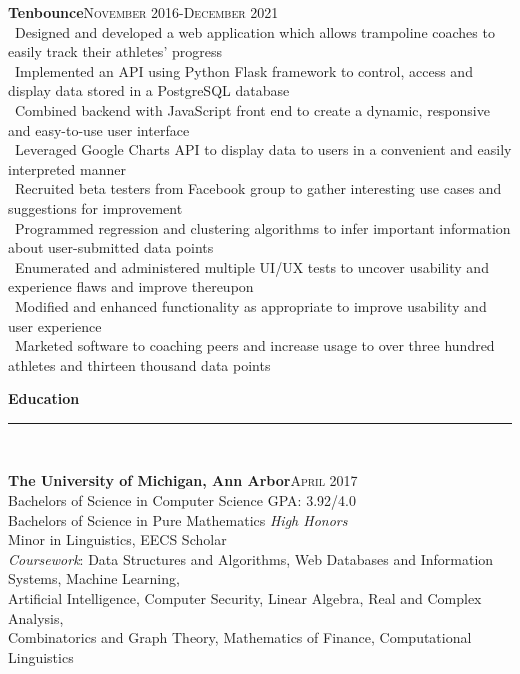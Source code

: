 \documentclass[a4paper,10pt]{article}
\newcommand{\horizontalline}{{\rule{533pt}{0.625pt}\\}}
\renewcommand{\section}[1]{{\noindent\textbf{\large #1}\\\horizontalline}}
\renewcommand{\subsection}[2]{{\noindent \textbf{#1}\hfill \textsc{#2}\\}}
\begin{document}
\subsection{Tenbounce}{November 2016-December 2021}
\textbullet\ Designed and developed a web application which allows trampoline coaches to easily track their athletes' progress\\
\textbullet\ Implemented an API using Python Flask framework to control, access and display data stored in a PostgreSQL database\\
\textbullet\ Combined backend with JavaScript front end to create a dynamic, responsive and easy-to-use user interface\\
\textbullet\ Leveraged Google Charts API to display data to users in a convenient and easily interpreted manner\\
\textbullet\ Recruited beta testers from Facebook group to gather interesting use cases and suggestions for improvement\\
\textbullet\ Programmed regression and clustering algorithms to infer important information about user-submitted data points\\
\textbullet\ Enumerated and administered multiple UI/UX tests to uncover usability and experience flaws and improve thereupon\\
\textbullet\ Modified and enhanced functionality as appropriate to improve usability and user experience\\
\textbullet\ Marketed software to coaching peers and increase usage to over three hundred athletes and thirteen thousand data points\\

\section{Education}
\subsection{The University of Michigan, Ann Arbor} {April 2017}
Bachelors of Science in Computer Science \hfill \normalsize \textsc{GPA}: 3.92/4.0\\
Bachelors of Science in Pure Mathematics \hfill \normalsize \textit{High Honors}\\
Minor in Linguistics, EECS Scholar\\
\textit{Coursework}: Data Structures and Algorithms, Web Databases and Information Systems, Machine Learning,\\
\hphantom{Coursework:::}Artificial Intelligence, Computer Security, Linear Algebra,
Real and Complex Analysis,\\
\hphantom{Coursework:::}Combinatorics and Graph Theory, Mathematics of Finance, Computational Linguistics\\
\end{document}
